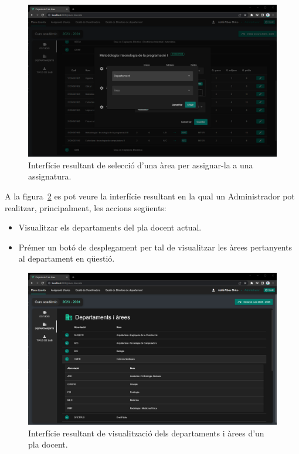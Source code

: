 \documentclass[a4paper,12pt]{ThesisStyle}
\begin{document}
\begin{figure}[H]
  \centering
  \includegraphics[width=\textwidth]{assets/results/plaDocent/modAssignaturaArea.png}
  \caption{\label{img:resultats_plaDocent_modAssignaturaArea}Interfície resultant de selecció d'una àrea per assignar-la a una assignatura.}
\end{figure}

\newpage

A la figura~\ref{img:resultats_plaDocent_departaments} es pot veure la interfície resultant en la qual un Administrador pot realitzar, principalment, les accions següents:
\begin{itemize}
  \item Visualitzar els departaments del pla docent actual.
  \item Prémer un botó de desplegament per tal de visualitzar les àrees pertanyents al departament en qüestió.
\end{itemize}

\begin{figure}[H]
  \centering
  \includegraphics[width=\textwidth]{assets/results/plaDocent/departaments.png}
  \caption{\label{img:resultats_plaDocent_departaments}Interfície resultant de visualització dels departaments i àrees d'un pla docent.}
\end{figure}
\end{document}
